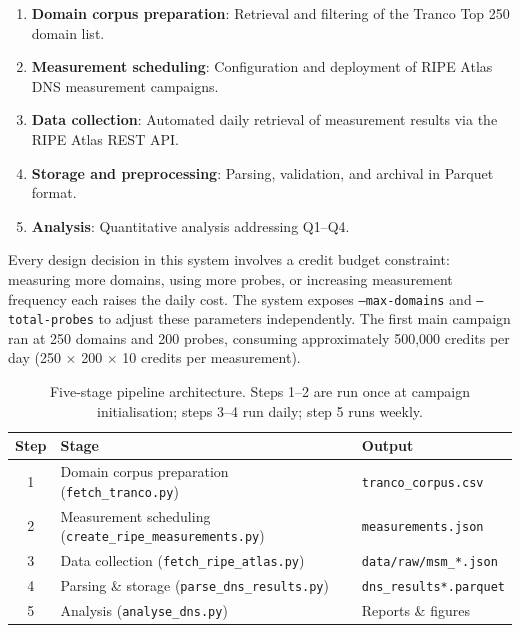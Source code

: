 \begin{enumerate}
  \item \textbf{Domain corpus preparation}: Retrieval and filtering of the Tranco Top 250 domain list.
  \item \textbf{Measurement scheduling}: Configuration and deployment of RIPE Atlas \ac{DNS} measurement campaigns.
  \item \textbf{Data collection}: Automated daily retrieval of measurement results via the RIPE Atlas REST API.
  \item \textbf{Storage and preprocessing}: Parsing, validation, and archival in Parquet format.
  \item \textbf{Analysis}: Quantitative analysis addressing Q1--Q4.
\end{enumerate}

Every design decision in this system involves a credit budget constraint: measuring more domains, using more probes, or increasing measurement frequency each raises the daily cost. The system exposes \texttt{--max-domains} and \texttt{--total-probes} to adjust these parameters independently. The first main campaign ran at 250 domains and 200 probes, consuming approximately 500,000 credits per day (250 $\times$ 200 $\times$ 10 credits per measurement).

\begin{table}[H]
\centering
\small
\begin{tabular}{c l l}
\toprule
\textbf{Step} & \textbf{Stage} & \textbf{Output} \\
\midrule
1 & Domain corpus preparation (\texttt{fetch\_tranco.py})         & \texttt{tranco\_corpus.csv} \\
2 & Measurement scheduling (\texttt{create\_ripe\_measurements.py}) & \texttt{measurements.json} \\
3 & Data collection (\texttt{fetch\_ripe\_atlas.py})               & \texttt{data/raw/msm\_*.json} \\
4 & Parsing \& storage (\texttt{parse\_dns\_results.py})           & \texttt{dns\_results*.parquet} \\
5 & Analysis (\texttt{analyse\_dns.py})                            & Reports \& figures \\
\bottomrule
\end{tabular}
\caption{Five-stage pipeline architecture. Steps 1--2 are run once at campaign initialisation; steps 3--4 run daily; step 5 runs weekly.}
\label{tab:pipeline_stages}
\end{table}

